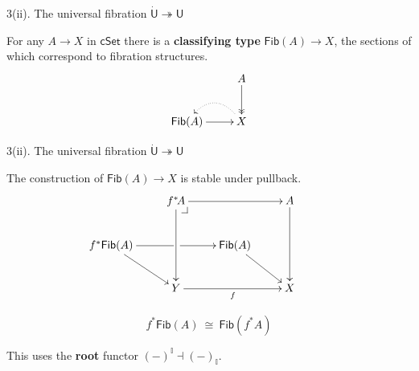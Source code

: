 \documentclass[handout]{beamer}
\makeatletter
\newcommand{\myemph}[1]{\textbf{#1}}    %
\newcommand{\cSet}{\ensuremath{\mathsf{cSet}}}
\newcommand{\pbcorner}[1][dr]{\save*!/#1-1.2pc/#1:(-1,1)@^{|-}\restore}
\newcommand{\ra}{\ensuremath{\rightarrow}}
\renewcommand{\epi}{\twoheadrightarrow}
\newcommand{\U}{\mathsf{U}}
\newcommand{\UU}{\dot{\mathsf{U}}}
\newcommand{\II}{\mathbb{I}}
\theoremstyle{remark}
\makeatother
\begin{document}
%
%
%
%
\begin{frame}{3(ii). The universal fibration $\UU\epi\U$}

For any $A\ra X$ in $\cSet$ there is a \myemph{classifying type} $\mathsf{Fib}(A) \ra X$, the 
sections of which correspond to fibration structures.
\[
\xymatrix{
& A\ar@{->>}[d] \\
\mathsf{Fib}(A) \ar[r] & X \ar@{..>} @/_4ex/ [l]
}
\]
%

\end{frame}
\begin{frame}{3(ii). The universal fibration $\UU\epi\U$}

The construction of $\mathsf{Fib}(A) \to X$ is stable under pullback.
\[
\xymatrix{
& f^*\!A \ar[dd] \ar[rr] \pbcorner && A \ar[dd] & \\
f^*\mathsf{Fib}(A) \ar[rd] \ar[rr] |<<<<<<<<<<<<<\hole  &&  \mathsf{Fib}(A) \ar[rd] \\
& Y \ar[rr]_f && X &
}
\]

\[
f^*\mathsf{Fib}(A)\ \cong\ \mathsf{Fib}(f^*\!A)
\]
\medskip
\pause

This uses the \myemph{root} functor $(-)^\II \dashv (-)_\II$. 

\end{frame}
\end{document}
